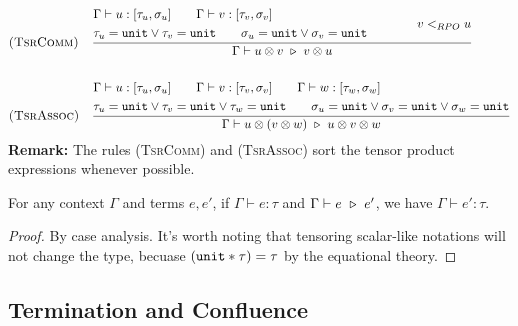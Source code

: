 \begin{align*}
  & \textsc{(TsrComm)} && 
  \frac{
    \begin{aligned}
      & \Gamma \vdash u : [\tau_u, \sigma_u] \qquad \Gamma \vdash v : [\tau_v, \sigma_v] \\
      & \tau_u = \texttt{unit} \vee \tau_v = \texttt{unit} \qquad \sigma_u = \texttt{unit} \vee \sigma_v = \texttt{unit}
    \end{aligned} \qquad \qquad v <_{RPO} u
    }{\Gamma \vdash u \otimes v \ \triangleright\  v \otimes u} \\
  \\
  & \textsc{(TsrAssoc)} &&
  \frac{
    \begin{aligned}
      & \Gamma \vdash u : [\tau_u, \sigma_u] \qquad \Gamma \vdash v : [\tau_v, \sigma_v] \qquad \Gamma \vdash w : [\tau_w, \sigma_w] \\
      & \tau_u = \texttt{unit} \vee \tau_v = \texttt{unit} \vee \tau_w = \texttt{unit} \qquad \sigma_u = \texttt{unit} \vee \sigma_v = \texttt{unit} \vee \sigma_w = \texttt{unit}
    \end{aligned}
    }{\Gamma \vdash u \otimes (v \otimes w) \ \triangleright\  u \otimes v \otimes w}
\end{align*}
\textbf{Remark:} The rules \textsc{(TsrComm)} and \textsc{(TsrAssoc)} sort the tensor product expressions whenever possible.


\begin{lemma}
  For any context $\Gamma$ and terms $e, e'$, if $\Gamma \vdash e : \tau$ and $\Gamma \vdash e \ \triangleright\  e'$, we have
  $ \Gamma \vdash e' : \tau $. 
\end{lemma}
\begin{proof}
  By case analysis. It's worth noting that tensoring scalar-like notations will not change the type, becuase $(\texttt{unit} * \tau) = \tau$ by the equational theory.
\end{proof}

\subsection{Termination and Confluence}


